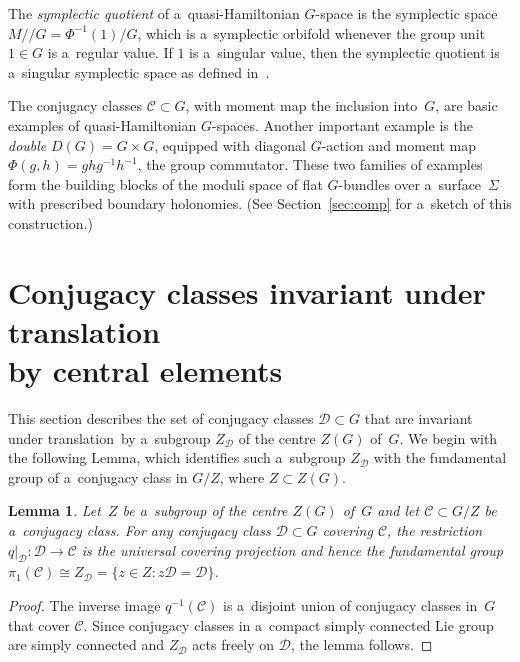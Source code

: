 \documentclass[pdftex]{sigma}
\numberwithin{equation}{section}
\newtheorem{Lemma}[Theorem]{Lemma}
\begin{document}
The \emph{symplectic quotient} of a~quasi-Hamiltonian $G$-space is the symplectic space $M/ /G = \Phi^{-1}(1)/G$, which
is a~symplectic orbifold whenever the group unit $1 \in G$ is a~regular value.
If $1$ is a~singular value, then the symplectic quotient is a~singular symplectic space as def\/ined in~\cite{MS}.

The conjugacy classes $\mathcal{C}\subset G$, with moment map the inclusion into~$G$, are basic examples of
quasi-Hamiltonian $G$-spaces.
Another important example is the \emph{double} $D(G)=G\times G$, equipped with diagonal $G$-action and moment map
$\Phi(g,h)=ghg^{-1}h^{-1}$, the group commutator.
These two families of examples form the building blocks of the moduli space of f\/lat $G$-bundles over a~surface~$\Sigma$
with prescribed boundary holonomies.
(See Section~\ref{sec:comp} for a~sketch of this construction.)

\section{Conjugacy classes invariant under translation \\
by central elements}

This section describes the set of conjugacy classes $\mathcal{D}\subset G$ that are invariant under translation~by
a~subgroup $Z_\mathcal{D}$ of the centre $Z(G)$ of~$G$.
We begin with the following Lemma, which identif\/ies such a~subgroup $Z_\mathcal{D}$ with the fundamental group of
a~conjugacy class in $G/Z$, where $Z\subset Z(G)$.

\begin{Lemma}
\label{lemma:pi1ofC}
Let~$Z$ be a~subgroup of the centre $Z(G)$ of~$G$ and let $\mathcal{C} \subset G/Z$ be a~conjugacy class.
For any conjugacy class $\mathcal{D}\subset G$ covering $\mathcal{C}$, the restriction $q|_{\mathcal{D}}: \mathcal{D}
\to \mathcal{C}$ is the universal covering projection and hence the fundamental group $\pi_1(\mathcal{C}) \cong
Z_\mathcal{D}=\{z \in Z \colon z\mathcal{D} = \mathcal{D} \}$.
\end{Lemma}

\begin{proof}
The inverse image $q^{-1}(\mathcal{C})$ is a~disjoint union of conjugacy classes in~$G$ that cover $\mathcal{C}$.
Since conjugacy classes in a~compact simply connected Lie group are simply connected and $Z_\mathcal{D}$ acts freely on
$\mathcal{D}$, the lemma follows.
\end{proof}
\end{document}
